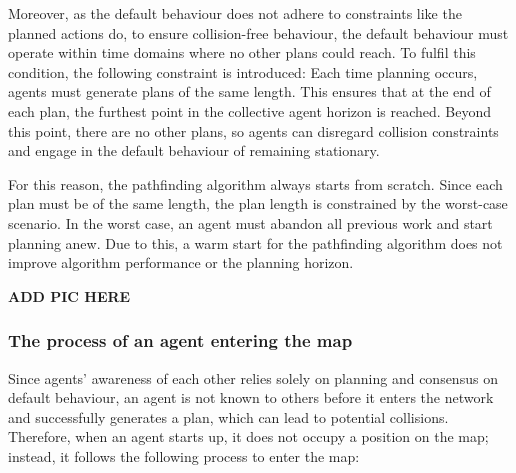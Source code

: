Moreover, as the default behaviour does not adhere to constraints like the planned actions do, to ensure collision-free behaviour, the default behaviour must operate within time domains where no other plans could reach.
To fulfil this condition, the following constraint is introduced: Each time planning occurs, agents must generate plans of the same length. 
This ensures that at the end of each plan, the furthest point in the collective agent horizon is reached. Beyond this point, there are no other plans, so agents can disregard collision constraints and engage in the default behaviour of remaining stationary.

For this reason, the pathfinding algorithm always starts from scratch. Since each plan must be of the same length, the plan length is constrained by the worst-case scenario. In the worst case, an agent must abandon all previous work and start planning anew. Due to this, a warm start for the pathfinding algorithm does not improve algorithm performance or the planning horizon.

\textbf{ADD PIC HERE} %

\subsubsection{The process of an agent entering the map}

Since agents' awareness of each other relies solely on planning and consensus on default behaviour, an agent is not known to others before it enters the network and successfully generates a plan, which can lead to potential collisions. Therefore, when an agent starts up, it does not occupy a position on the map; instead, it follows the following process to enter the map:

